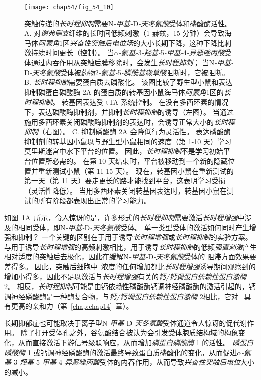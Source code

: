 \begin{figure}[htbp]
	\centering
	\texttt{[image: chap54/fig\_54\_10]}
	\caption{突触传递的\textit{长时程抑制}需要N\textit{-甲基-}D\textit{-天冬氨酸}受体和磷酸酶活性。
		A. 对\textit{谢弗侧支}纤维的长时间低频刺激（1 赫兹，15 分钟）会导致海马体\textit{阿蒙角}1区\textit{兴奋性突触后电位场}的大小长期下降，这种下降比刺激持续时间更长（控制）。
		当\textit{$\alpha$-氨基-}3\textit{-羟基-}5\textit{-甲基-}4\textit{-异恶唑丙酸}受体通过内吞作用从突触后膜移除时，会发生\textit{长时程抑制}；
		当N\textit{-甲基-}D\textit{-天冬氨酸}受体被药物2\textit{-氨基-}5\textit{-膦酰基缬草酸}阻断时，它被阻断\cite{dudek1992homosynaptic}。
		B. \textit{长时程抑制}需要蛋白质去磷酸化。
		该图比较了野生型小鼠和表达抑制磷蛋白磷酸酶 2A 的蛋白质的转基因小鼠海马体\textit{阿蒙角}1区的\textit{长时程抑制}。
		转基因表达受 tTA 系统控制。
		在没有多西环素的情况下，表达磷酸酶抑制剂，并抑制\textit{长时程抑制}的诱导（左图）。
		当通过施用多西环素关闭磷酸酶抑制剂的表达时，会诱导正常大小的\textit{长时程抑制}（右图）。
		C. 抑制磷酸酶 2A 会降低行为灵活性。
		表达磷酸酶抑制剂的转基因小鼠以与野生型小鼠相同的速度（第 1-10 天）学习莫里斯迷宫中水下平台的位置。
		因此，\textit{长时程抑制}不是学习初始平台位置所必需的。
		在第 10 天结束时，平台被移动到一个新的隐藏位置并重新测试小鼠（第 11-15 天）。
		现在，转基因小鼠在重新测试的第一天（第 11 天）要走更长的路才能找到平台，这表明学习受损（灵活性降低）。
		当用多西环素关闭转基因表达时，转基因小鼠在测试的所有阶段都表现出正常的学习能力\cite{nicholls2008transgenic}。}
	\label{fig:54_10}
\end{figure}


如图~\ref{fig:54_10}A~所示，令人惊讶的是，许多形式的\textit{长时程抑制}需要激活\textit{长时程增强}中涉及的相同受体，即N\textit{-甲基-}D\textit{-天冬氨酸}受体。
单一类型受体的激活如何同时产生增强和抑制？
一个关键的区别在于用于诱导\textit{长时程增强}或\textit{长时程抑制}的实验方案。
与用于诱导\textit{长时程增强}的高频刺激相比，用于诱导\textit{长时程抑制}的低频\textit{强直刺激}产生相对适度的突触后去极化，因此在缓解N\textit{-甲基-}D\textit{-天冬氨酸}受体的  阻滞方面效果要差得多。
因此，突触后细胞中~浓度的任何增加都比\textit{长时程增强}诱导期间观察到的增加小得多，因此不足以激活与\textit{长时程增强}有关的\textit{钙/钙调蛋白依赖性蛋白激酶} 2。
相反，\textit{长时程抑制}可能是由钙依赖性磷酸酶钙调神经磷酸酶的激活引起的，钙调神经磷酸酶是一种酶复合物，与\textit{钙/钙调蛋白依赖性蛋白激酶} 2相比，它对~ 具有更高的亲和力（第~\ref{chap:chap14}~章）。


长期抑郁症也可能取决于离子型N\textit{-甲基-}D\textit{-天冬氨酸}受体通道令人惊讶的促代谢作用。
除了打开受体孔之外，谷氨酸结合被认为会引发受体胞质结构域的构象变化，从而直接激活下游信号级联响应，从而增加\textit{磷蛋白磷酸酶} 1 的活性。
\textit{磷蛋白磷酸酶} 1 或钙调神经磷酸酶的激活最终导致蛋白质磷酸化的变化，从而促进\textit{$\alpha$-氨基-}3\textit{-羟基-}5\textit{-甲基-}4\textit{-异恶唑丙酸}受体的内吞作用，从而导致\textit{兴奋性突触后电位}大小的减小。


